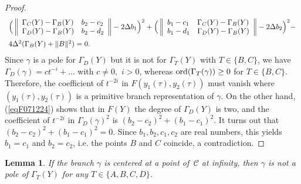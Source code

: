 \documentclass[10pt]{amsart}
\newtheorem{lem}[thm]{Lemma}
\theoremstyle{definition}
\theoremstyle{remark}
\def\cC{\mathcal C}
\begin{document}
\begin{proof}
\begin{equation}
\begin{array}{l}
\Big(\left\|\begin{array}{ll}
\Gamma_C(Y)-\Gamma_B(Y)  & b_2-c_2 \\
\Gamma_D(Y)-\Gamma_B(Y) & b_2-d_2  \\
  \end{array}\right\|
  -2\Delta b_1\Big)^2+
  \vspace{0.2cm}
\Big(\left\|
\begin{array}{ll}
b_1-c_1 &\Gamma_C(Y)-\Gamma_B(Y)\\
b_1-d_1 & \Gamma_D(Y)-\Gamma_B(Y) \\
\end{array}\right\|
  -2\Delta b_2\Big)^2-\\
  4\Delta^2(\Gamma_B(Y)+\|B\|^2)=0.
\end{array}
\end{equation}
Since $\gamma$ is a pole for $\Gamma_D(Y)$ but it is not for  $\Gamma_T(Y)$ with $T\in\{B,C\}$, we have
$\Gamma_D(\gamma)=ct^{-i}+\ldots$ with $c\neq 0,$ $i>0$, whereas ${\rm{ord}}(\Gamma_T(\gamma))\ge 0$ for $T\in\{B,C\}$.
Therefore, the coefficient of $t^{-2i}$ in $F(y_1(\tau),y_2(\tau))$ must vanish where $(y_1(\tau),y_2(\tau))$ is a primitive branch representation of $\gamma$.
On the other hand, (\ref{eqF071224}) shows that in $F(Y)$ the degree of  $\Gamma_D(Y)$ is two,
and the coefficient of $t^{-2i}$ in $\Gamma_D(\gamma)^2$  is $(b_2-c_2)^2+(b_1-c_1)^2$. It turns out that $(b_2-c_2)^2+(b_1-c_1)^2=0$. Since $b_1,b_2,c_1,c_2$ are real numbers, this yields $b_1=c_1$ and $b_2=c_2$, i.e.
the points $B$ and $C$ coincide, a contradiction.
\end{proof}
\begin{lem}
\label{lemH071224} If the branch $\gamma$ is centered at a point of\, $\cC$ at infinity, then $\gamma$ is not a pole of $\Gamma_T(Y)$ for any $T\in \{A,B,C,D\}$.
\end{lem}
\end{document}
